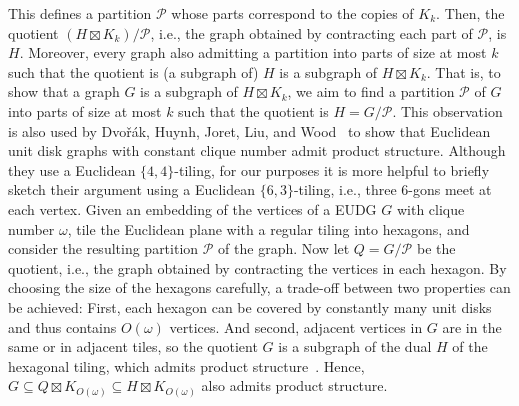 \documentclass[11pt]{article}
\newcommand{\calP}{\ensuremath{\mathcal{P}}\xspace}
\begin{document}
This defines a partition \calP whose parts correspond to the copies of $ K_k $.
Then, the quotient $ (H \boxtimes K_k) / \calP $, i.e., the graph obtained by contracting each part of \calP, is $ H $.
Moreover, every graph also admitting a partition into parts of size at most $ k $ such that the quotient is (a subgraph of) $ H $ is a subgraph of $ H \boxtimes K_k $.
That is, to show that a graph $ G $ is a subgraph of $ H \boxtimes K_k $, we aim to find a partition \calP of $ G $ into parts of size at most $ k $ such that the quotient is $ H = G / \calP $.
%
This observation is also used by Dvořák, Huynh, Joret, Liu, and Wood~\cite{dvorak_notes_2021} to show that Euclidean unit disk graphs with constant clique number admit product structure.
Although they use a Euclidean $ \{ 4, 4 \} $-tiling, for our purposes it is more helpful to briefly sketch their argument using a Euclidean $ \{ 6, 3 \} $-tiling, i.e., three 6-gons meet at each vertex.
%
Given an embedding of the vertices of a EUDG $G$ with clique number $ \omega $, tile the Euclidean plane with a regular tiling into hexagons, and consider the resulting partition $\calP$ of the graph.
Now let $ Q = G / \calP $ be the quotient, i.e., the graph obtained by contracting the vertices in each hexagon.
By choosing the size of the hexagons carefully, a trade-off between two properties can be achieved: 
First, each hexagon can be covered by constantly many unit disks and thus contains $ O(\omega) $ vertices.
And second, adjacent vertices in $ G $ are in the same or in adjacent tiles, so the quotient $ G $ is a subgraph of the dual $ H $ of the hexagonal tiling, which admits product structure~\cite{dujmovic_planar_2019}.
Hence, $ G \subseteq Q \boxtimes K_{O(\omega)} \subseteq H \boxtimes K_{O(\omega)} $ also admits product structure.
\end{document}
